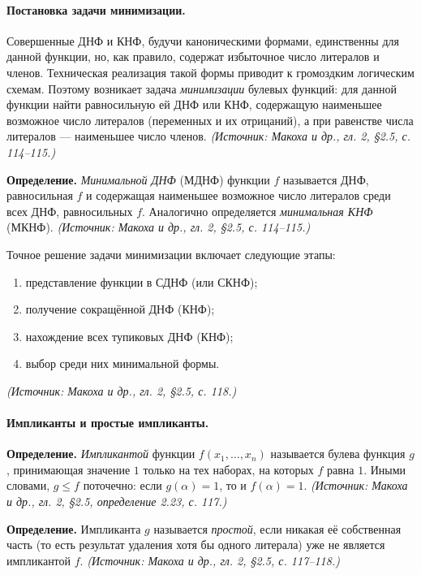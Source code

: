 \documentclass[a4paper,12pt]{article}
\begin{document}
\paragraph{Постановка задачи минимизации.}
Совершенные ДНФ и КНФ, будучи каноническими формами, единственны для данной функции, но, как правило, содержат избыточное число литералов и членов. Техническая реализация такой формы приводит к громоздким логическим схемам. Поэтому возникает задача \emph{минимизации} булевых функций: для данной функции найти равносильную ей ДНФ или КНФ, содержащую наименьшее возможное число литералов (переменных и их отрицаний), а при равенстве числа литералов — наименьшее число членов.
\textit{(Источник: Макоха и др., гл. 2, §2.5, с. 114--115.)}

\textbf{Определение.} \emph{Минимальной ДНФ} (МДНФ) функции \(f\) называется ДНФ, равносильная \(f\) и содержащая наименьшее возможное число литералов среди всех ДНФ, равносильных \(f\). Аналогично определяется \emph{минимальная КНФ} (МКНФ).
\textit{(Источник: Макоха и др., гл. 2, §2.5, с. 114--115.)}

Точное решение задачи минимизации включает следующие этапы:
\begin{enumerate}[label=\arabic*)]
\item представление функции в СДНФ (или СКНФ);
\item получение сокращённой ДНФ (КНФ);
\item нахождение всех тупиковых ДНФ (КНФ);
\item выбор среди них минимальной формы.
\end{enumerate}
\textit{(Источник: Макоха и др., гл. 2, §2.5, с. 118.)}

\paragraph{Импликанты и простые импликанты.}
\textbf{Определение.} \emph{Импликантой} функции \(f(x_1,\ldots,x_n)\) называется булева функция \(g\), принимающая значение \(1\) только на тех наборах, на которых \(f\) равна \(1\). Иными словами, \(g\le f\) поточечно: если \(g(\alpha)=1\), то и \(f(\alpha)=1\).
\textit{(Источник: Макоха и др., гл. 2, §2.5, определение 2.23, с. 117.)}

\textbf{Определение.} Импликанта \(g\) называется \emph{простой}, если никакая её собственная часть (то есть результат удаления хотя бы одного литерала) уже не является импликантой \(f\).
\textit{(Источник: Макоха и др., гл. 2, §2.5, с. 117--118.)}
\end{document}
